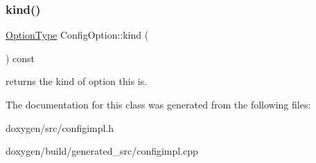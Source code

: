 \subsubsection{\texorpdfstring{kind()}{kind()}}
{\footnotesize\ttfamily \mbox{\hyperlink{class_config_option_ad60cb308cdf307e72796dc2fc2a40fda}{Option\+Type}} Config\+Option\+::kind (\begin{DoxyParamCaption}{ }\end{DoxyParamCaption}) const\hspace{0.3cm}{\ttfamily [inline]}}

returns the kind of option this is. 

The documentation for this class was generated from the following files\+:\begin{DoxyCompactItemize}
\item 
doxygen/src/configimpl.\+h\item 
doxygen/build/generated\+\_\+src/configimpl.\+cpp\end{DoxyCompactItemize}
